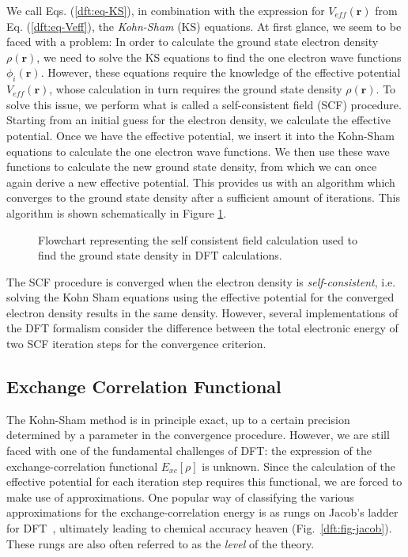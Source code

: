 \begin{refsection}
We call Eqs. (\ref{dft:eq-KS}), in combination with the expression for 
$V_{eff}(\mathbf{r})$ from Eq. (\ref{dft:eq-Veff}), the \textit{Kohn-Sham} (\gls{KS}) 
equations. At first glance, we seem to be faced with a problem: In order to 
calculate the ground state electron density $\rho(\mathbf{r})$, we need to 
solve the \gls{KS} equations to find the one electron wave functions 
$\phi_i(\mathbf{r})$. However, these equations require the knowledge of the 
effective potential $V_{eff}(\mathbf{r})$, whose calculation in turn requires 
the ground state density $\rho(\mathbf{r})$. To solve this issue, we perform 
what is called a self-consistent field (\gls{SCF}) procedure. Starting from 
an initial guess for the electron density, we calculate the effective 
potential. Once we have the effective potential, we insert it into the 
Kohn-Sham equations to calculate the one electron wave functions. We then use 
these wave functions to calculate the new ground state density, from which we 
can once again derive a new effective potential. This provides us with an 
algorithm which converges to the ground state density after a sufficient 
amount of iterations. This algorithm is shown schematically in Figure 
\ref{dft:fig-scf_cycle}.  

\begin{figure}[ht]  
\centering 

\caption{\label{dft:fig-scf_cycle} Flowchart representing the self consistent field 
calculation used to find the ground state density in \gls{DFT} calculations.} 
\end{figure} 
 
The \gls{SCF} procedure is converged when the electron density is 
\textit{self-consistent}, i.e. solving the Kohn Sham equations using the 
effective potential for the converged electron density results in the same 
density. However, several implementations of the \gls{DFT} formalism consider the 
difference between the total electronic energy of two \gls{SCF} iteration steps for 
the convergence criterion. 
 
\subsection{Exchange Correlation Functional} \label{dft:sec-functionals} 
 
The Kohn-Sham method is in principle exact, up to a certain precision 
determined by a parameter in the convergence procedure. However, we are still 
faced with one of the fundamental challenges of \gls{DFT}: the expression of the 
exchange-correlation functional $E_{xc}[\rho]$ is unknown. Since the calculation of the effective potential for each iteration step requires this functional, we 
are forced to make use of approximations. One popular way of classifying the 
various approximations for the exchange-correlation energy is as rungs on 
Jacob's ladder for \gls{DFT}~\cite{Perdew2001}, ultimately leading to chemical 
accuracy heaven (Fig.~\ref{dft:fig-jacob}). These rungs are also often referred to 
as the \textit{level} of the theory. 
 

\end{refsection}
